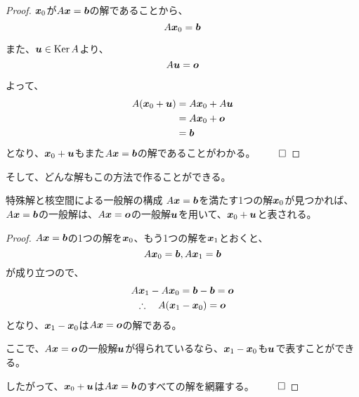 \documentclass[../../../topic_linear-algebra]{subfiles}
\begin{document}
\begin{proof}
  $\vb*{x}_0$が$A\vb*{x} = \vb*{b}$の解であることから、
  \begin{equation*}
    A\vb*{x}_0 = \vb*{b}
  \end{equation*}

  また、$\vb*{u} \in \operatorname{Ker} A$より、
  \begin{equation*}
    A\vb*{u} = \vb*{o}
  \end{equation*}

  よって、
  \begin{align*}
    A(\vb*{x}_0 + \vb*{u}) & = A\vb*{x}_0 + A\vb*{u} \\
                           & = A\vb*{x}_0 + \vb*{o}  \\
                           & = \vb*{b}
  \end{align*}
  となり、$\vb*{x}_0 + \vb*{u}$もまた$A\vb*{x} = \vb*{b}$の解であることがわかる。 $\qed$
\end{proof}

\br

そして、どんな解もこの方法で作ることができる。

\begin{theorem}{特殊解と核空間による一般解の構成}
  $A\vb*{x} = \vb*{b}$を満たす1つの解$\vb*{x}_0$が見つかれば、$A\vb*{x} = \vb*{b}$の一般解は、$A\vb*{x} = \vb*{o}$の一般解$\vb*{u}$を用いて、$\vb*{x}_0 + \vb*{u}$と表される。
\end{theorem}

\begin{proof}
  $A\vb*{x} = \vb*{b}$の1つの解を$\vb*{x}_0$、もう1つの解を$\vb*{x}_1$とおくと、
  \begin{equation*}
    A\vb*{x}_0 = \vb*{b}, A\vb*{x}_1 = \vb*{b}
  \end{equation*}
  が成り立つので、
  \begin{gather*}
    A\vb*{x}_1 - A\vb*{x}_0 = \vb*{b} - \vb*{b} = \vb*{o} \\
    \therefore \quad A(\vb*{x}_1 - \vb*{x}_0) = \vb*{o}
  \end{gather*}
  となり、$\vb*{x}_1 - \vb*{x}_0$は$A\vb*{x} = \vb*{o}$の解である。

  \br

  ここで、$A\vb*{x} = \vb*{o}$の一般解$\vb*{u}$が得られているなら、$\vb*{x}_1 - \vb*{x}_0$も$\vb*{u}$で表すことができる。

  \br

  したがって、$\vb*{x}_0 + \vb*{u}$は$A\vb*{x} = \vb*{b}$のすべての解を網羅する。 $\qed$
\end{proof}
\end{document}
